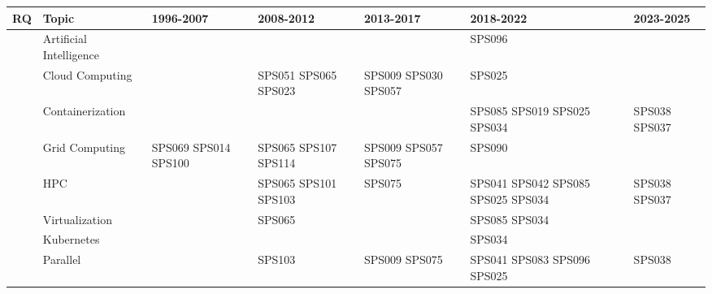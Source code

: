 \begin{table}
	{\fontsize{7}{10}\selectfont
		\renewcommand{\arraystretch}{1.2}
		\setlength{\tabcolsep}{3pt}
		\begin{tabular}{>{\raggedright\arraybackslash}p{1.0cm}>{\raggedright\arraybackslash}p{3.0cm}>{\raggedright\arraybackslash}p{2.2cm}>{\raggedright\arraybackslash}p{2.2cm}>{\raggedright\arraybackslash}p{2.2cm}>{\raggedright\arraybackslash}p{2.2cm}>{\raggedright\arraybackslash}p{2.2cm}} \toprule
			\textbf{RQ}                    & \textbf{Topic}          & \textbf{1996-2007}   & \textbf{2008-2012}   & \textbf{2013-2017}   & \textbf{2018-2022}                 & \textbf{2023-2025} \\
			\midrule
			\multirow{12}{*}{\textbf{RQ1}} & Artificial Intelligence &                      &                      &                      & SPS096                             &                    \\
			                               & Cloud Computing         &                      & SPS051 SPS065 SPS023 & SPS009 SPS030 SPS057 & SPS025                             &                    \\
			                               & Containerization        &                      &                      &                      & SPS085 SPS019 SPS025 SPS034        & SPS038 SPS037      \\
			                               & Grid Computing          & SPS069 SPS014 SPS100 & SPS065 SPS107 SPS114 & SPS009 SPS057 SPS075 & SPS090                             &                    \\
			                               & HPC                     &                      & SPS065 SPS101 SPS103 & SPS075               & SPS041 SPS042 SPS085 SPS025 SPS034 & SPS038 SPS037      \\
			                               & Virtualization          &                      & SPS065               &                      & SPS085 SPS034                      &                    \\
			                               & Kubernetes              &                      &                      &                      & SPS034                             &                    \\
			                               & Parallel                &                      & SPS103               & SPS009 SPS075        & SPS041 SPS083 SPS096 SPS025        & SPS038             \\

\end{tabular}}
\end{table}
